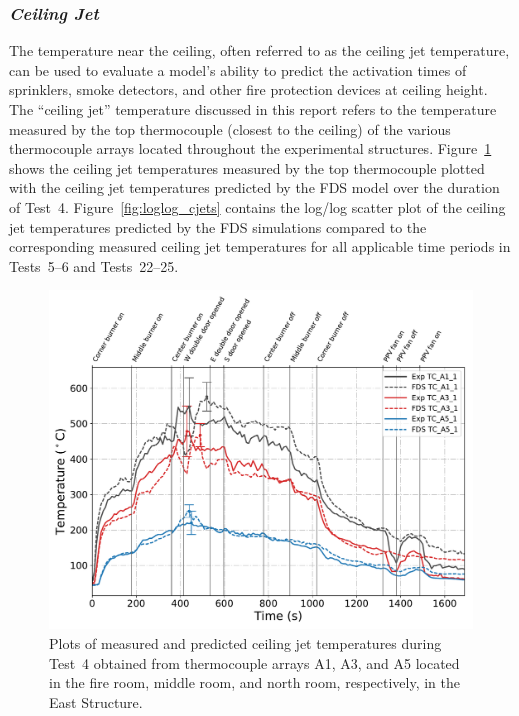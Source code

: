 \FloatBarrier
\subsubsection*{\textit{Ceiling Jet}}
The temperature near the ceiling, often referred to as the ceiling jet temperature, can be used to evaluate a model's ability to predict the activation times of sprinklers, smoke detectors, and other fire protection devices at ceiling height. The ``ceiling jet'' temperature discussed in this report refers to the temperature measured by the top thermocouple (closest to the ceiling) of the various thermocouple arrays located throughout the experimental structures. Figure~\ref{fig:cjet_data} shows the ceiling jet temperatures measured by the top thermocouple plotted with the ceiling jet temperatures predicted by the FDS model over the duration of Test~4. Figure~\ref{fig:loglog_cjets} contains the log/log scatter plot of the ceiling jet temperatures predicted by the FDS simulations compared to the corresponding measured ceiling jet temperatures for all applicable time periods in Tests~5--6 and Tests~22--25.
\begin{figure}[!h]
	\centering
	\includegraphics[width=\columnwidth]{Figures/Plots/Validation/Temperature/Test_4_cjet_1}
	\caption[Plots of measured and predicted ceiling jet temperatures during Test~4.]{Plots of measured and predicted ceiling jet temperatures during Test~4 obtained from thermocouple arrays A1, A3, and A5 located in the fire room, middle room, and north room, respectively, in the East Structure.}
	\label{fig:cjet_data}
\end{figure}

